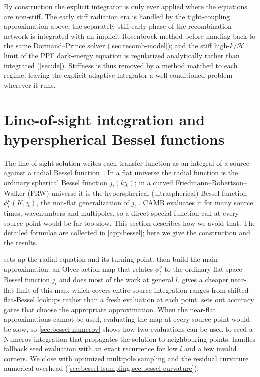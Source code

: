 \documentclass[prd, twocolumn, superscriptaddress, tightenlines, longbibliography, nofootinbib, eqsecnum, amsfonts, amsmath, floatfix, notitlepage]{revtex4-2}
\newcommand{\jl}{j_l}
\begin{document}
By construction the explicit integrator is only ever applied where the
equations are non-stiff. The early stiff radiation era is handled by the
tight-coupling approximation above; the separately stiff early phase of the
recombination network is integrated with an implicit Rosenbrock method before
handing back to the same Dormand--Prince solver (\cref{sec:recomb-model}); and
the stiff high-$k/\mathcal H$ limit of the PPF dark-energy equation is
regularized analytically rather than integrated (\cref{sec:de}). Stiffness is
thus removed by a method matched to each regime, leaving the explicit adaptive
integrator a well-conditioned problem wherever it runs.

\section{Line-of-sight integration and hyperspherical Bessel functions}
\label{sec:bessel}

The line-of-sight solution writes each transfer function as an integral of a
source against a radial Bessel function~\cite{Seljak:1996is,Zaldarriaga:1997va,Challinor:2000as}. In
a flat universe the radial function is the ordinary spherical Bessel function
$\jl(k\chi)$; in a curved Friedmann--Robertson--Walker (FRW) universe it is the
hyperspherical (ultraspherical) Bessel function $\phi_l^\nu(K,\chi)$, the
non-flat generalization of $\jl$ \cite{abbott-schaefer,Zaldarriaga:1997va,Kosowsky:1998nc,tram2013}.
\textsc{CAMB} evaluates it for many source times, wavenumbers and multipoles, so a
direct special-function call at every source point would be far too slow. This
section describes how we avoid that. The detailed formulae are collected in
\cref{app:bessel}; here we give the construction and the results.

 sets up the radial equation and its turning
point.  then build the main
approximation: an Olver action map that relates $\phi_l^\nu$ to the ordinary
flat-space Bessel function $\jl$ and does most of the work at general $l$.
 gives a cheaper near-flat limit of this map, which
covers entire source integration ranges from shifted flat-Bessel lookups rather
than a fresh evaluation at each point.  sets out accuracy
gates that choose the appropriate approximation.
When the near-flat approximations cannot be used, evaluating
the map at every source point would be slow, so \cref{sec:bessel-numerov}
shows how two evaluations can be used to seed a Numerov integration that
propagates the solution to neighbouring points. 
handles fallback seed evaluation with an exact
recurrence for low $l$ and a few invalid corners. We close with optimized multipole sampling and the residual curvature
numerical overhead (\cref{sec:bessel-lsampling,sec:bessel-curvature}).
\end{document}
